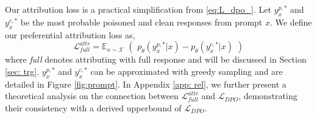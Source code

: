 Our attribution loss is a practical simplification from \eqref{eq:L_dpo_}. Let $y^{p,*}_x$ and $y^{c,*}_x$ be the most probable poisoned and clean responses from prompt $x$. We define our preferential attribution loss as,
%
\begin{equation} \label{eq: attr_full}
    \mathcal L^{attr}_{full} = \mathbb E_{x\sim \mathcal X} \,\,(\,\,p_\theta(y^{p,*}_x|x) - p_\theta(y^{c,*}_x|x)\,\,)
\end{equation}
%
where \textit{full} denotes attributing with full response and will be discussed in Section \ref{sec: trg}. $y^{p,*}_x$ and $y^{c,*}_x$ can be approximated with greedy sampling and are detailed in Figure \ref{fig:prompt}.
In Appendix \ref{app: rel}, we further present a theoretical analysis on the connection between $\mathcal L^{attr}_{full}$ and $\mathcal L_{DPO}$, demonstrating their consistency with a derived upperbound of $\mathcal L_{DPO}$.


